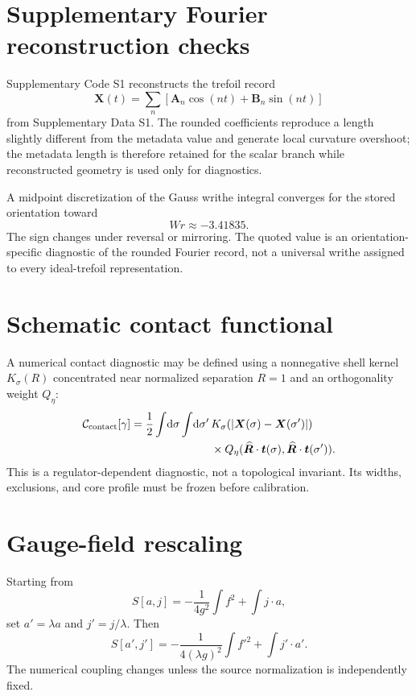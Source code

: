 \documentclass[aps,pre,preprint,notitlepage,nofootinbib,superscriptaddress]{revtex4-2}
\newcommand{\dd}{\mathrm d}
\newcommand{\calC}{\mathcal C}
\newcommand{\unitvec}[1]{\widehat{\bm #1}}
\begin{document}
\appendix

\section{Supplementary Fourier reconstruction checks}

Supplementary Code S1 reconstructs the trefoil record
\begin{equation}
  \bm X(t)=\sum_n\left[\bm A_n\cos(nt)+\bm B_n\sin(nt)\right]
\end{equation}
from Supplementary Data S1.  The rounded coefficients reproduce a length slightly different from the metadata value and generate local curvature overshoot; the metadata length is therefore retained for the scalar branch while reconstructed geometry is used only for diagnostics.

A midpoint discretization of the Gauss writhe integral converges for the stored orientation toward
\begin{equation}
  Wr\approx-3.41835.
\end{equation}
The sign changes under reversal or mirroring.  The quoted value is an orientation-specific diagnostic of the rounded Fourier record, not a universal writhe assigned to every ideal-trefoil representation.

\section{Schematic contact functional}

A numerical contact diagnostic may be defined using a nonnegative shell kernel $K_\sigma(R)$ concentrated near normalized separation $R=1$ and an orthogonality weight $Q_\eta$:
\begin{align}
  \calC_{\rm contact}[\gamma]
  =\frac12\int\!\dd\sigma\int\!\dd\sigma'\,
  &K_\sigma(|\bm X(\sigma)-\bm X(\sigma')|)\\
  &\times Q_\eta(\unitvec{R}\cdot\bm t(\sigma),
                  \unitvec{R}\cdot\bm t(\sigma')).
\end{align}
This is a regulator-dependent diagnostic, not a topological invariant.  Its widths, exclusions, and core profile must be frozen before calibration.

\section{Gauge-field rescaling}

Starting from
\begin{equation}
  S[a,j]=-\frac{1}{4g^2}\int f^2+\int j\cdot a,
\end{equation}
set $a'=\lambda a$ and $j'=j/\lambda$.  Then
\begin{equation}
  S[a',j']=-\frac{1}{4(\lambda g)^2}\int f'^2+\int j'\cdot a'.
\end{equation}
The numerical coupling changes unless the source normalization is independently fixed.
\end{document}
